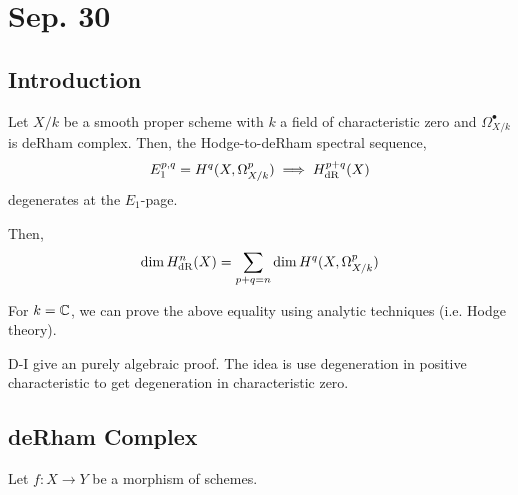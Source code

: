 \documentclass[12pt]{article}
\begin{document}
\section{Sep. 30}

\subsection{Introduction}

\begin{thm}
Let $X / k$ be a smooth proper scheme with $k$ a field of characteristic zero and $\Omega^\bullet_{X/k}$ is deRham complex. Then, the Hodge-to-deRham spectral sequence,
\[ E_1^{p,q} = H^{q}(X, \Omega^p_{X/k}) \implies H_{\mathrm{dR}}^{p+q}(X) \]
degenerates at the $E_1$-page.
\end{thm}

\begin{cor}
Then,
\[ \dim{H^n_{\mathrm{dR}}(X)} = \sum_{p + q = n} \dim{H^q(X, \Omega^p_{X/k})} \]
\end{cor}

\begin{rmk}
For $k = \mathbb{C}$, we can prove the above equality using analytic techniques (i.e. Hodge theory). 
\end{rmk}

\begin{rmk}
D-I give an purely algebraic proof. The idea is use degeneration in positive characteristic to get degeneration in characteristic zero. 
\end{rmk}

\subsection{deRham Complex}

Let $f : X \to Y$ be a morphism of schemes. 
\end{document}
